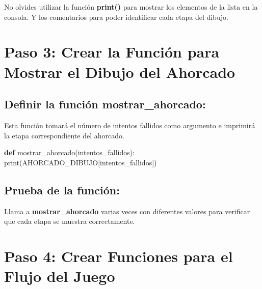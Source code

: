 \documentclass[
  a4paper,
  DIV=11,
  numbers=noendperiod,
  onepage,
  openany]{scrreprt}
\newenvironment{Shaded}{\begin{snugshade}}{\end{snugshade}}
\newcommand{\BuiltInTok}[1]{\textcolor[rgb]{0.00,0.23,0.31}{#1}}
\newcommand{\KeywordTok}[1]{\textcolor[rgb]{0.00,0.23,0.31}{\textbf{#1}}}
\newcommand{\NormalTok}[1]{\textcolor[rgb]{0.00,0.23,0.31}{#1}}
\begin{document}
\begin{tcolorbox}[enhanced jigsaw, toptitle=1mm, titlerule=0mm, left=2mm, opacityback=0, coltitle=black, leftrule=.75mm, title=\textcolor{quarto-callout-tip-color}{\faLightbulb}\hspace{0.5em}{Tip}, bottomrule=.15mm, arc=.35mm, opacitybacktitle=0.6, bottomtitle=1mm, toprule=.15mm, colbacktitle=quarto-callout-tip-color!10!white, rightrule=.15mm, breakable, colframe=quarto-callout-tip-color-frame, colback=white]

No olvides utilizar la función \textbf{print()} para mostrar los
elementos de la lista en la consola. Y los comentarios para poder
identificar cada etapa del dibujo.

\end{tcolorbox}

\section{Paso 3: Crear la Función para Mostrar el Dibujo del
Ahorcado}\label{paso-3-crear-la-funciuxf3n-para-mostrar-el-dibujo-del-ahorcado}

\subsection{Definir la función
mostrar\_ahorcado:}\label{definir-la-funciuxf3n-mostrar_ahorcado}

Esta función tomará el número de intentos fallidos como argumento e
imprimirá la etapa correspondiente del ahorcado.

\begin{Shaded}
\begin{Highlighting}[]
\KeywordTok{def}\NormalTok{ mostrar\_ahorcado(intentos\_fallidos):}
    \BuiltInTok{print}\NormalTok{(AHORCADO\_DIBUJO[intentos\_fallidos])}
\end{Highlighting}
\end{Shaded}

\subsection{Prueba de la función:}\label{prueba-de-la-funciuxf3n}

Llama a \textbf{mostrar\_ahorcado} varias veces con diferentes valores
para verificar que cada etapa se muestra correctamente.

\section{Paso 4: Crear Funciones para el Flujo del
Juego}\label{paso-4-crear-funciones-para-el-flujo-del-juego}
\end{document}
